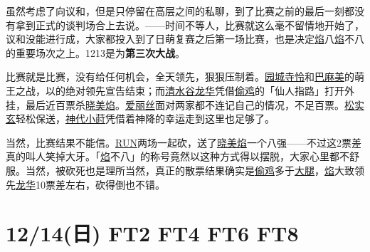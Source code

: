 
虽然考虑了向议和，但是只停留在高层之间的私聊，到了比赛之前的最后一刻都没有拿到正式的谈判场合上去说。——时间不等人，比赛就这么毫不留情地开始了，议和没能进行成，大家都投入到了日萌复赛之后第一场比赛，也是决定\uline{焰}八\uline{焰}不八的重要场次之上。1213是为\textbf{第三次大战}。

比赛就是比赛，没有给任何机会，全天领先，狠狠压制着。\uline{园城寺怜}和\uline{巴麻美}的萌王之战，以的绝对领先宣告结束；而\uline{清水谷龙华}凭借\uline{偷鸡}的「仙人指路」打开外挂，最后近百票杀\uline{晓美焰}。\uline{爱丽丝}面对两家都不连记自己的情况，不足百票。\uline{松实玄}轻松保送，\uline{神代小莳}凭借着神降的幸运走到这里也足够了。

当然，比赛结果不能信。\uline{RUN}两场一起砍，送了\uline{晓美焰}一个八强——不过这2票差真的叫人笑掉大牙。「\uline{焰}不八」的称号竟然以这种方式得以摆脱，大家心里都不舒服。当然，被砍死也是理所当然，真正的散票结果确实是\uline{偷鸡}多于\uline{大腿}，\uline{焰}大致领先\uline{龙华}10票差左右，砍得倒也不错。
\clearpage
\section{12/14(日) FT2 FT4 FT6 FT8}


